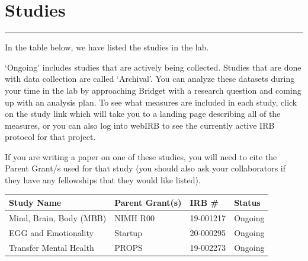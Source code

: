 \documentclass[]{book}
\begin{document}
\hypertarget{studies}{%
\chapter{Studies}\label{studies}}

\begin{center}\rule{0.5\linewidth}{\linethickness}\end{center}

In the table below, we have listed the studies in the lab.

`Ongoing' includes studies that are actively being collected. Studies that are done with data collection are called `Archival'. You can analyze these datasets during your time in the lab by approaching Bridget with a research question and coming up with an analysis plan. To see what measures are included in each study, click on the study link which will take you to a landing page describing all of the measures, or you can also log into webIRB to see the currently active IRB protocol for that project.

If you are writing a paper on one of these studies, you will need to cite the Parent Grant/s used for that study (you should also ask your collaborators if they have any fellowships that they would like listed).

\begin{longtable}[]{@{}llll@{}}
\toprule
Study Name & Parent Grant(s) & IRB \# & Status\tabularnewline
\midrule
\endhead
Mind, Brain, Body (MBB) & NIMH R00 & 19-001217 & Ongoing\tabularnewline
EGG and Emotionality & Startup & 20-000295 & Ongoing\tabularnewline
Transfer Mental Health & PROPS & 19-002273 & Ongoing\tabularnewline
\bottomrule
\end{longtable}


\end{document}
